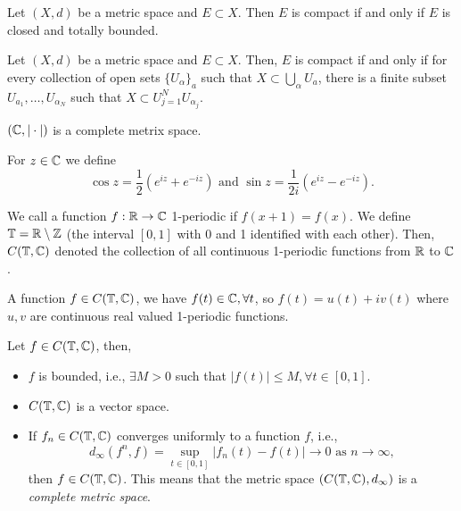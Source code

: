\documentclass[twoside]{article}
\begin{document}
\begin{theorem}
    Let $(X, d)$ be a metric space and $E \subset X$. 
    Then $E$ is compact if and only if $E$ is closed and totally bounded.
\end{theorem}

\begin{definition}
    Let $(X, d)$ be a metric space and $E \subset X$. Then, $E$ is compact
    if and only if for every collection of open sets $\{U_{\alpha}\}_{a}$
    such that $X \subset \bigcup_{\alpha} U_{a}$, there is a finite 
    subset $U_{a_{1}}, \dots, U_{\alpha_{N}}$ such that 
    $X \subset U_{j = 1}^{N} U_{\alpha_{j}}$.
\end{definition}

\begin{theorem}
    $(\mathbb{C}, |\cdot|)$ is a complete metrix space.
\end{theorem}

\begin{definition}
    For $z \in \mathbb{C}$ we define 
    \begin{equation*}
        \cos z = \frac{1}{2}(e^{iz} + e^{-iz}) \text{ and }
        \sin z = \frac{1}{2i}(e^{iz} - e^{-iz}).
    \end{equation*}
\end{definition}

\begin{definition}
    We call a function $f: \mathbb{R} \to \mathbb{C}$ 1-periodic if $f(x + 1) = f(x)$.
    We define $\mathbb{T} = \mathbb{R} \setminus \mathbb{Z}$ (the interval $[0, 1]$
    with 0 and 1 identified with each other). Then, $C(\mathbb{T}, \mathbb{C})$
    denoted the collection of all continuous 1-periodic functions
    from $\mathbb{R}$ to $\mathbb{C}$.

    A function $f \in C(\mathbb{T}, \mathbb{C})$, we have $f(t) \in \mathbb{C}, \forall t$,
    so $f(t) = u(t) + iv(t)$ where $u, v$ are continuous real valued
    1-periodic functions.
\end{definition}

\begin{theorem}
    Let $f \in C(\mathbb{T}, \mathbb{C})$, then,
    \begin{itemize}
        \item $f$ is bounded, i.e., $\exists M > 0$ such that $|f(t)| \leq M, \forall t \in [0, 1]$.
        \item $C(\mathbb{T}, \mathbb{C})$ is a vector space.
        \item If $f_{n} \in C(\mathbb{T}, \mathbb{C})$ converges uniformly to a function $f$, i.e.,
            \begin{equation*}
                d_{\infty}(f^{n}, f) = \sup_{t \in [0, 1]} |f_{n}(t) - f(t)| \to 0 \text{ as } n \to \infty,
            \end{equation*}
            then $f \in C(\mathbb{T}, \mathbb{C})$. This means that the metric space 
            $(C(\mathbb{T}, \mathbb{C}), d_{\infty})$ is a \textit{complete metric space}.
    \end{itemize}
\end{theorem}
\end{document}
